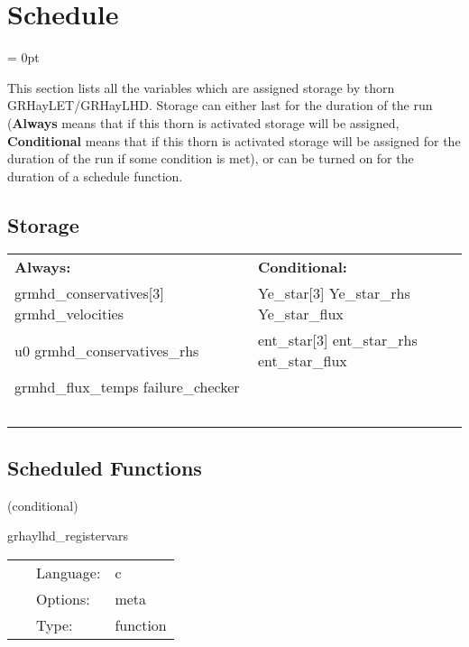 
\section{Schedule} 


\parskip = 0pt


\noindent This section lists all the variables which are assigned storage by thorn GRHayLET/GRHayLHD.  Storage can either last for the duration of the run ({\bf Always} means that if this thorn is activated storage will be assigned, {\bf Conditional} means that if this thorn is activated storage will be assigned for the duration of the run if some condition is met), or can be turned on for the duration of a schedule function.


\subsection*{Storage}

\hspace{5mm}

 \begin{tabular*}{160mm}{ll} 

{\bf Always:}& {\bf Conditional:} \\ 
 grmhd\_conservatives[3] grmhd\_velocities &  Ye\_star[3] Ye\_star\_rhs Ye\_star\_flux\\ 
 u0 grmhd\_conservatives\_rhs &  ent\_star[3] ent\_star\_rhs ent\_star\_flux\\ 
 grmhd\_flux\_temps failure\_checker & ~\\ 
~ & ~\\ 
\end{tabular*} 


\subsection*{Scheduled Functions}
\vspace{5mm}

   (conditional) 

\hspace{5mm} grhaylhd\_registervars 

\hspace{5mm}{\it register evolved, rhs variables in grhaylhd for mol } 


\hspace{5mm}

 \begin{tabular*}{160mm}{cll} 
~ & Language:  & c \\ 
~ & Options:  & meta \\ 
~ & Type:  & function \\ 
\end{tabular*} 


